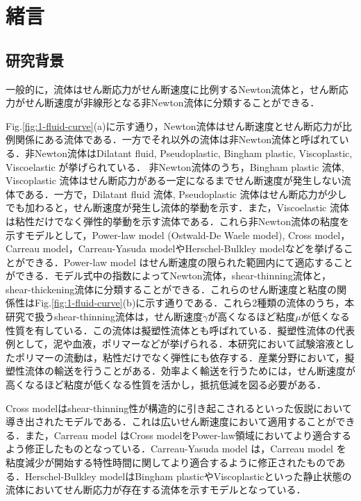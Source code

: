 \section{緒言}

\subsection{研究背景}

一般的に，流体はせん断応力がせん断速度に比例するNewton流体と，せん断応力がせん断速度が非線形となる非Newton流体に分類することができる．

Fig.\ref{fig:1-fluid-curve}(a)に示す通り，Newton流体はせん断速度とせん断応力が比例関係にある流体である．一方でそれ以外の流体は非Newton流体と呼ばれている．非Newton流体はDilatant fluid, Pseudoplastic, Bingham plastic, Viscoplastic, Viscoelastic が挙げられている．
非Newton流体のうち，Bingham plastic 流体, Viscoplastic 流体はせん断応力がある一定になるまでせん断速度が発生しない流体である．一方で，Dilatant fluid 流体, Pseudoplastic 流体はせん断応力が少しでも加わると，せん断速度が発生し流体的挙動を示す．また，Viscoelastic 流体は粘性だけでなく弾性的挙動を示す流体である．これら非Newton流体の粘度を示すモデルとして，Power-law model (Ostwald-De Waele model), Cross model，Carreau model，Carreau-Yasuda modelやHerschel-Bulkley modelなどを挙げることができる\cite{ref:1}．Power-law model はせん断速度の限られた範囲内にて適応することができる．モデル式中の指数によってNewton流体，shear-thinning流体と，shear-thickening流体に分類することができる．これらのせん断速度と粘度の関係性はFig.\ref{fig:1-fluid-curve}(b)に示す通りである．これら2種類の流体のうち，本研究で扱うshear-thinning流体は，せん断速度$\dot{\gamma}$が高くなるほど粘度$\mu$が低くなる性質を有している．この流体は擬塑性流体とも呼ばれている．擬塑性流体の代表例として，泥や血液，ポリマーなどが挙げられる．本研究において試験溶液としたポリマーの流動は，粘性だけでなく弾性にも依存する\cite{viscoelasticity}．産業分野において，擬塑性流体の輸送を行うことがある．効率よく輸送を行うためには，せん断速度が高くなるほど粘度が低くなる性質を活かし，抵抗低減を図る必要がある．

Cross modelはshear-thinning性が構造的に引き起こされるといった仮説において導き出されたモデルである．これは広いせん断速度において適用することができる．また，Carreau model はCross modelをPower-law領域においてより適合するよう修正したものとなっている．Carreau-Yasuda model は，Carreau model を粘度減少が開始する特性時間に関してより適合するように修正されたものである．Herschel-Bulkley modelはBingham plasticやViscoplasticといった静止状態の流体においてせん断応力が存在する流体を示すモデルとなっている\cite{ref:1}．

